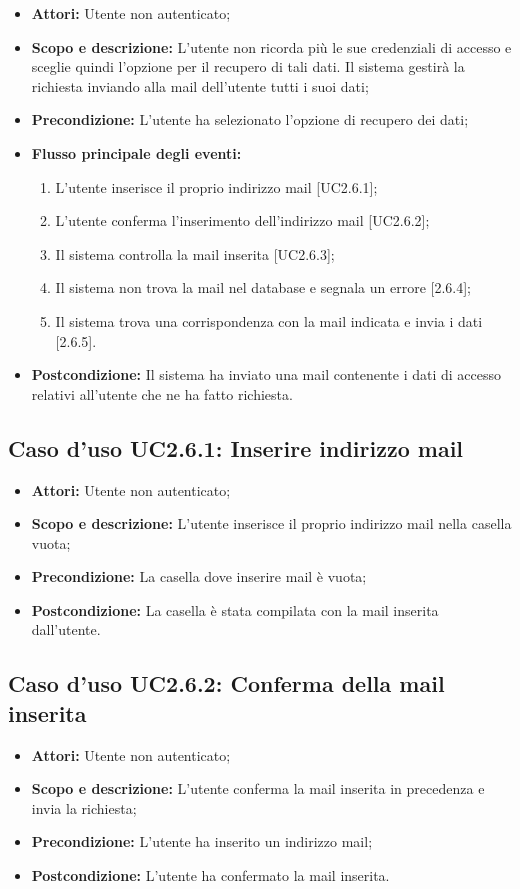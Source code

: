 \begin{itemize}
	\item \textbf{Attori:} Utente non autenticato;
	\item \textbf{Scopo e descrizione:} L'utente non ricorda più le sue credenziali di accesso e sceglie quindi l'opzione per il recupero di tali dati. Il sistema gestirà la richiesta inviando alla mail dell'utente tutti i suoi dati;
	\item \textbf{Precondizione:} L'utente ha selezionato l'opzione di recupero dei dati;
	\item \textbf{Flusso principale degli eventi:}
	\begin{enumerate}
		\item L'utente inserisce il proprio indirizzo mail [UC2.6.1];
		\item L'utente conferma l'inserimento dell'indirizzo mail [UC2.6.2];
		\item Il sistema controlla la mail inserita [UC2.6.3];
		\item Il sistema non trova la mail nel database e segnala un errore [2.6.4];
		\item Il sistema trova una corrispondenza con la mail indicata e invia i dati [2.6.5].
	\end{enumerate}
	\item \textbf{Postcondizione:} Il sistema ha inviato una mail contenente i dati di accesso relativi all'utente che ne ha fatto richiesta.
\end{itemize}

\subsection{Caso d'uso UC2.6.1: Inserire indirizzo mail}
\begin{itemize}
	\item \textbf{Attori:} Utente non autenticato;
	\item \textbf{Scopo e descrizione:} L'utente inserisce il proprio indirizzo mail nella casella vuota;
	\item \textbf{Precondizione:} La casella dove inserire mail è vuota;
	\item \textbf{Postcondizione:} La casella è stata compilata con la mail inserita dall'utente.
\end{itemize}

\subsection{Caso d'uso UC2.6.2: Conferma della mail inserita}
\begin{itemize}
	\item \textbf{Attori:} Utente non autenticato;
	\item \textbf{Scopo e descrizione:} L'utente conferma la mail inserita in precedenza e invia la richiesta;
	\item \textbf{Precondizione:} L'utente ha inserito un indirizzo mail;
	\item \textbf{Postcondizione:} L'utente ha confermato la mail inserita.
\end{itemize}

